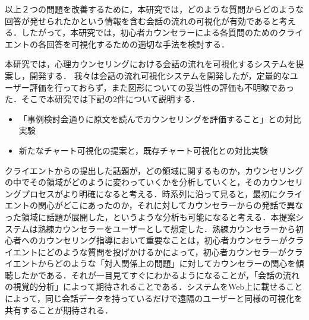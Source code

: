 \documentclass[shuuron]{kuee}
\begin{document}





以上２つの問題を改善するために，本研究では，どのような質問からどのような回答が発せられたかという情報を含む会話の流れの可視化が有効であると考える．したがって，本研究では，初心者カウンセラーによる各質問のためのクライエントの各回答を可視化するための適切な手法を検討する．

本研究では，心理カウンセリングにおける会話の流れを可視化するシステムを提案し，開発する．
我々\cite{uetsuji}は会話の流れ可視化システムを開発したが，定量的なユーザー評価を行っておらず，また図形についての妥当性の評価も不明瞭であった．そこで本研究では下記の2件について説明する．
\begin{itemize}
  \item 「事例検討会通りに原文を読んでカウンセリングを評価すること」との対比実験
  \item 新たなチャート可視化の提案と，既存チャート可視化との対比実験
\end{itemize}

クライエントからの提出した話題が，どの領域に関するものか，カウンセリングの中でその領域がどのように変わっていくかを分析していくと，そのカウンセリングプロセスがより明確になると考える．時系列に沿って見ると，最初にクライエントの関心がどこにあったのか，それに対してカウンセラーからの発話で異なった領域に話題が展開した，というような分析も可能になると考える．本提案システムは熟練カウンセラーをユーザーとして想定した．熟練カウンセラーから初心者へのカウンセリング指導において重要なことは，初心者カウンセラーがクライエントにどのような質問を投げかけるかによって，初心者カウンセラーがクライエントからどのような「対人関係上の問題」に対してカウンセラーの関心を傾聴したかである．それが一目見てすぐにわかるようになることが，「会話の流れの視覚的分析」によって期待されることである．システムをWeb上に載せることによって，同じ会話データを持っているだけで遠隔のユーザーと同様の可視化を共有することが期待される．
\end{document}
